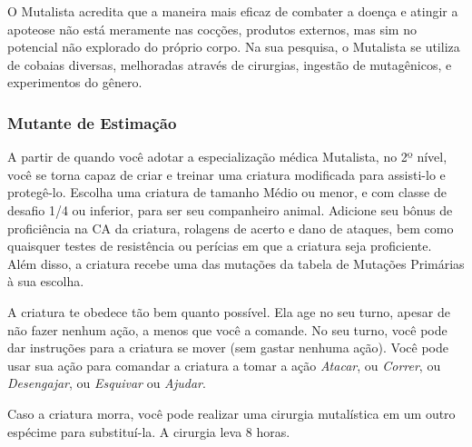 \documentclass[letterpaper,twocolumn,openany]{dndbook}
\begin{document}
	O Mutalista acredita que a maneira mais eficaz de combater a doença e atingir a apoteose não está meramente nas cocções, produtos externos, mas sim no potencial não explorado do próprio corpo. Na sua pesquisa, o Mutalista se utiliza de cobaias diversas, melhoradas através de cirurgias, ingestão de mutagênicos, e experimentos do gênero.
	
	\subsubsection{Mutante de Estimação}
	A partir de quando você adotar a especialização médica Mutalista, no 2º nível, você se torna capaz de criar e treinar uma criatura modificada para assisti-lo e protegê-lo. Escolha uma criatura de tamanho Médio ou menor, e com classe de desafio 1/4 ou inferior, para ser seu companheiro animal. Adicione seu bônus de proficiência na CA da criatura, rolagens de acerto e dano de ataques, bem como quaisquer testes de resistência ou perícias em que a criatura seja proficiente. Além disso, a criatura recebe uma das mutações da tabela de Mutações Primárias à sua escolha.
	\par A criatura te obedece tão bem quanto possível. Ela age no seu turno, apesar de não fazer nenhum ação, a menos que você a comande. No seu turno, você pode dar instruções para a criatura se mover (sem gastar nenhuma ação). Você pode usar sua ação para comandar a criatura a tomar a ação \textit{Atacar}, ou \textit{Correr}, ou \textit{Desengajar}, ou \textit{Esquivar} ou \textit{Ajudar}.
	\par Caso a criatura morra, você pode realizar uma cirurgia mutalística em um outro espécime para substituí-la. A cirurgia leva 8 horas.
	
\end{document}
